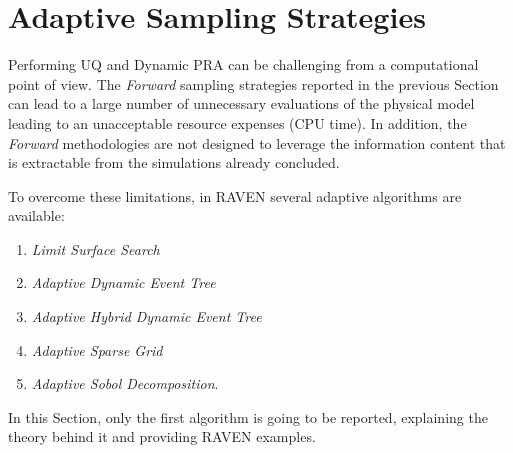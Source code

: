 \section{Adaptive Sampling Strategies}
Performing UQ and Dynamic PRA can be
challenging from a computational point of view. The \textit{Forward}
sampling strategies reported in the previous Section can lead to a large number of
unnecessary evaluations of the physical model leading to an unacceptable resource expenses (CPU time).
In addition, the \textit{Forward} methodologies are not designed to leverage the information
content that is extractable from the simulations already concluded.

To overcome these limitations, in RAVEN several adaptive algorithms are available:
\begin{enumerate}
  \item \textit{Limit Surface Search}
  \item \textit{Adaptive Dynamic Event Tree}
  \item \textit{Adaptive Hybrid Dynamic Event Tree}
  \item \textit{Adaptive Sparse Grid}
  \item \textit{Adaptive Sobol Decomposition}.
\end{enumerate}
In this Section, only the first algorithm is going to be reported, explaining the theory behind it
and providing RAVEN examples.

